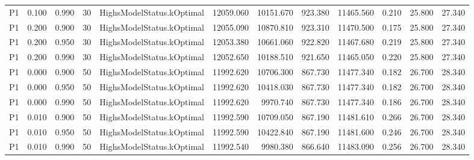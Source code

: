 \begin{table}
\begin{tabular}{lrrrlrrrrrrr}
P1 & 0.100 & 0.990 & 30 & HighsModelStatus.kOptimal & 12059.060 & 10151.670 & 923.380 & 11465.560 & 0.210 & 25.800 & 27.340 \\
P1 & 0.200 & 0.900 & 30 & HighsModelStatus.kOptimal & 12055.090 & 10870.810 & 923.310 & 11470.500 & 0.175 & 25.800 & 27.340 \\
P1 & 0.200 & 0.950 & 30 & HighsModelStatus.kOptimal & 12053.380 & 10661.060 & 922.820 & 11467.680 & 0.219 & 25.800 & 27.340 \\
P1 & 0.200 & 0.990 & 30 & HighsModelStatus.kOptimal & 12052.650 & 10188.510 & 921.650 & 11465.050 & 0.220 & 25.800 & 27.340 \\
P1 & 0.000 & 0.900 & 50 & HighsModelStatus.kOptimal & 11992.620 & 10706.300 & 867.730 & 11477.340 & 0.182 & 26.700 & 28.340 \\
P1 & 0.000 & 0.950 & 50 & HighsModelStatus.kOptimal & 11992.620 & 10418.030 & 867.730 & 11477.340 & 0.182 & 26.700 & 28.340 \\
P1 & 0.000 & 0.990 & 50 & HighsModelStatus.kOptimal & 11992.620 & 9970.740 & 867.730 & 11477.340 & 0.186 & 26.700 & 28.340 \\
P1 & 0.010 & 0.900 & 50 & HighsModelStatus.kOptimal & 11992.590 & 10709.050 & 867.190 & 11481.610 & 0.266 & 26.700 & 28.340 \\
P1 & 0.010 & 0.950 & 50 & HighsModelStatus.kOptimal & 11992.590 & 10422.840 & 867.190 & 11481.600 & 0.246 & 26.700 & 28.340 \\
P1 & 0.010 & 0.990 & 50 & HighsModelStatus.kOptimal & 11992.540 & 9980.380 & 866.640 & 11483.090 & 0.256 & 26.700 & 28.340 \\
\bottomrule
\end{tabular}
\end{table}


